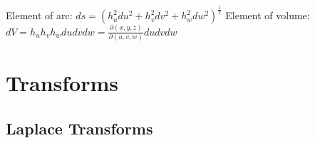 \documentclass[12pt]{article}
\begin{document}
\begin{flushleft}
	\textbullet \quad Element of arc: $\displaystyle ds = \left( h_u^2 du^2 + h_v^2 dv^2 + h_w^2 dw^2 \right)^{\frac{1}{2}} $ \linebreak 
	\textbullet \quad Element of volume: $\displaystyle dV = h_uh_vh_w dudvdw = \frac{\partial (x,y,z)}{\partial (u,v,w)} dudvdw $ \linebreak 
	
	
	\pagebreak
	
	
	\section{Transforms} 
	
	\subsection{Laplace Transforms}
	

\end{flushleft}
\end{document}
